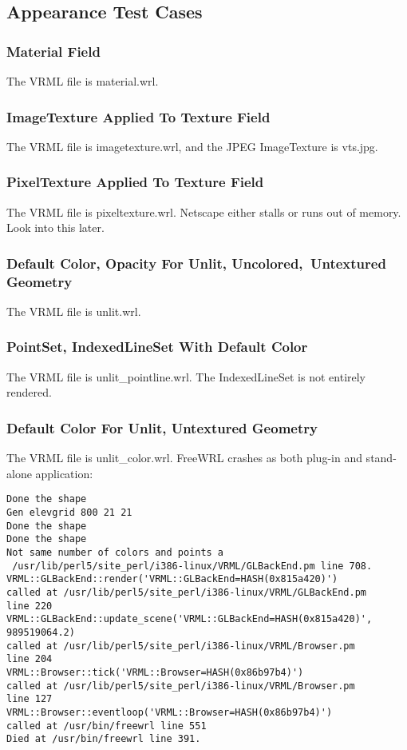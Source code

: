\documentclass[12pt,letterpaper]{article}
\newcommand{\AppA}{Material Field}
\newcommand{\AppB}{ImageTexture Applied To Texture Field}
\newcommand{\AppC}{PixelTexture Applied To Texture Field}
\newcommand{\AppDa}{Default Color, Opacity For Unlit, Uncolored,~}
\newcommand{\AppDb}{Untextured Geometry}
\newcommand{\AppE}{PointSet, IndexedLineSet With Default Color}
\newcommand{\AppF}{Default Color For Unlit, Untextured Geometry}
\begin{document}
\subsection{Appearance Test Cases}

\subsubsection{\AppA}
The VRML file is material.wrl.

\subsubsection{\AppB}
\label{sec:imagetexture}
The VRML file is imagetexture.wrl, and the JPEG ImageTexture is vts.jpg.

\subsubsection{\AppC}
The VRML file is pixeltexture.wrl.\newline
Netscape either stalls or runs out of memory.
Look into this later.

\subsubsection{\AppDa\AppDb}
\label{sec:unlit}
The VRML file is unlit.wrl.

\subsubsection{\AppE}
The VRML file is unlit\_pointline.wrl.\newline
The IndexedLineSet is not entirely rendered.

\subsubsection{\AppF}
The VRML file is unlit\_color.wrl.\newline
FreeWRL crashes as both plug-in and stand-alone application:
\begin{verbatim}
Done the shape
Gen elevgrid 800 21 21
Done the shape
Done the shape
Not same number of colors and points a
 /usr/lib/perl5/site_perl/i386-linux/VRML/GLBackEnd.pm line 708.
VRML::GLBackEnd::render('VRML::GLBackEnd=HASH(0x815a420)')
called at /usr/lib/perl5/site_perl/i386-linux/VRML/GLBackEnd.pm
line 220
VRML::GLBackEnd::update_scene('VRML::GLBackEnd=HASH(0x815a420)',
989519064.2)
called at /usr/lib/perl5/site_perl/i386-linux/VRML/Browser.pm
line 204
VRML::Browser::tick('VRML::Browser=HASH(0x86b97b4)')
called at /usr/lib/perl5/site_perl/i386-linux/VRML/Browser.pm
line 127
VRML::Browser::eventloop('VRML::Browser=HASH(0x86b97b4)')
called at /usr/bin/freewrl line 551
Died at /usr/bin/freewrl line 391.
\end{verbatim}
\end{document}
